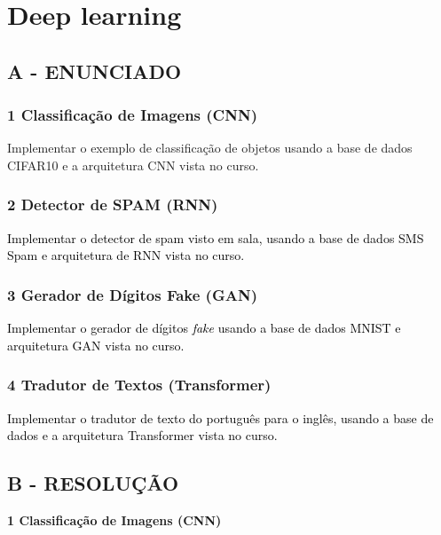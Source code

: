 \label{ap:ap09}
\chapter{Deep learning}
\section*{\textbf{A - ENUNCIADO}}

\subsection*{\textbf{1 Classificação de Imagens (CNN)}}



Implementar o exemplo de classificação de objetos usando a base de dados CIFAR10 e a arquitetura CNN vista no curso.



\subsection*{\textbf{2 Detector de SPAM (RNN)}}



\textcolor{black}{Implementar o detector de spam visto em sala, usando a base de dados SMS Spam e arquitetura de RNN
vista no curso.}



\subsection*{\textbf{3 Gerador de Dígitos Fake (GAN)}}



\textcolor{black}{Implementar o gerador de dígitos }\textit{\textcolor{black}{fake}}\textcolor{black}{ usando a base de
dados MNIST e arquitetura GAN vista no curso.}



\subsection*{\textbf{4 Tradutor de Textos (Transformer)}}



\textcolor{black}{Implementar o tradutor de texto do português para o inglês, usando a base de dados e a arquitetura
Transformer vista no curso.}

\section*{\textbf{B - RESOLUÇÃO}}
\begin{adjustwidth}{1em}{}
\textbf{1 Classificação de Imagens (CNN)}
\end{adjustwidth}

